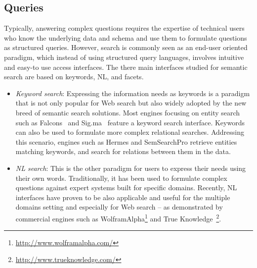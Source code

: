  
\subsection{Queries}
Typically, answering complex questions requires the expertise of technical users who know the underlying data and schema and use them to formulate questions as structured queries. However, search is commonly seen as an end-user oriented paradigm, which instead of using structured query languages, involves intuitive and easy-to use access interfaces. The there main interfaces studied for semantic search are based on keywords, NL, and facets. 

\begin{itemize}
	\item \emph{Keyword search}: Expressing the information needs as keywords is a paradigm that is not only popular for Web search but also widely adopted by the new breed of semantic search solutions. Most engines focusing on entity search such as Falcons~\cite{DBLP:journals/ijswis/ChengQ09} and Sig.ma~\cite{DBLP:journals/ws/TummarelloCCDDD10} feature a keyword search interface. Keywords can also be used to formulate more complex relational searches. Addressing this scenario, engines such as Hermes and SemSearchPro retrieve entities matching keywords, and search for relations between them in the data.  
	\item \emph{NL search}: This is the other paradigm for users to express their needs using their own words. Traditionally, it has been used to formulate complex questions against expert systems built for specific domains. Recently, NL interfaces have proven to be also applicable and useful for the multiple domains setting and especially for Web search -- as demonstrated by commercial engines such as WolframAlpha\footnote{\url{http://www.wolframalpha.com/}} and True Knowledge~\footnote{\url{http://www.trueknowledge.com/}}. 	

\end{itemize}
